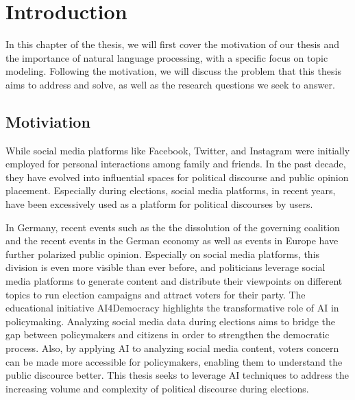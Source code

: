 

%
%

\chapter{Introduction}\label{ch:1-intro}%
%

In this chapter of the thesis, we will first cover the motivation of our thesis and the importance of natural language processing, with a specific focus on topic modeling.
Following the motivation, we will discuss the problem that this thesis aims to address and solve, as well as the research questions we seek to answer.

\section{Motiviation}
While social media platforms like Facebook, Twitter, and Instagram were initially employed for personal interactions among family and friends. In the past decade, they have evolved into influential spaces for political discourse and public opinion placement.
Especially during elections, social media platforms, in recent years, have been excessively used as a platform for political discourses by users.

In Germany, recent events such as the the dissolution of the governing coalition and the recent events in the German economy as well as events in Europe have further polarized public opinion.
Especially on social media platforms, this division is even more visible than ever before, and politicians leverage social media platforms to generate content and distribute their viewpoints on different topics to run election campaigns and attract voters for their party.
The educational initiative AI4Democracy highlights the transformative role of AI in policymaking. Analyzing social media data during elections aims to bridge the gap between policymakers and citizens in order to strengthen the democratic process. Also, by applying AI to analyzing social media content, voters concern can be made more accessible for policymakers, enabling them to understand the public discource better.
This thesis seeks to leverage AI techniques to address the increasing volume and complexity of political discourse during elections.

